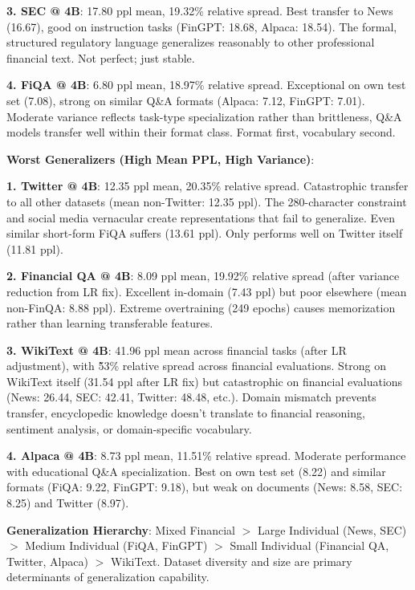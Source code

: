 \textbf{3. SEC @ 4B}: 17.80 ppl mean, 19.32\% relative spread. Best transfer to News (16.67), good on instruction tasks (FinGPT: 18.68, Alpaca: 18.54). The formal, structured regulatory language generalizes reasonably to other professional financial text. Not perfect; just stable.

\textbf{4. FiQA @ 4B}: 6.80 ppl mean, 18.97\% relative spread. Exceptional on own test set (7.08), strong on similar Q\&A formats (Alpaca: 7.12, FinGPT: 7.01). Moderate variance reflects task-type specialization rather than brittleness, Q\&A models transfer well within their format class. Format first, vocabulary second.

\textbf{Worst Generalizers (High Mean PPL, High Variance)}:

\textbf{1. Twitter @ 4B}: 12.35 ppl mean, 20.35\% relative spread. Catastrophic transfer to all other datasets (mean non-Twitter: 12.35 ppl). The 280-character constraint and social media vernacular create representations that fail to generalize. Even similar short-form FiQA suffers (13.61 ppl). Only performs well on Twitter itself (11.81 ppl).

\textbf{2. Financial QA @ 4B}: 8.09 ppl mean, 19.92\% relative spread (after variance reduction from LR fix). Excellent in-domain (7.43 ppl) but poor elsewhere (mean non-FinQA: 8.88 ppl). Extreme overtraining (249 epochs) causes memorization rather than learning transferable features.

\textbf{3. WikiText @ 4B}: 41.96 ppl mean across financial tasks (after LR adjustment), with \~53\% relative spread across financial evaluations. Strong on WikiText itself (31.54 ppl after LR fix) but catastrophic on financial evaluations (News: 26.44, SEC: 42.41, Twitter: 48.48, etc.). Domain mismatch prevents transfer, encyclopedic knowledge doesn't translate to financial reasoning, sentiment analysis, or domain-specific vocabulary.

\textbf{4. Alpaca @ 4B}: 8.73 ppl mean, 11.51\% relative spread. Moderate performance with educational Q\&A specialization. Best on own test set (8.22) and similar formats (FiQA: 9.22, FinGPT: 9.18), but weak on documents (News: 8.58, SEC: 8.25) and Twitter (8.97).

\textbf{Generalization Hierarchy}: Mixed Financial $>$ Large Individual (News, SEC) $>$ Medium Individual (FiQA, FinGPT) $>$ Small Individual (Financial QA, Twitter, Alpaca) $>$ WikiText. Dataset diversity and size are primary determinants of generalization capability.

